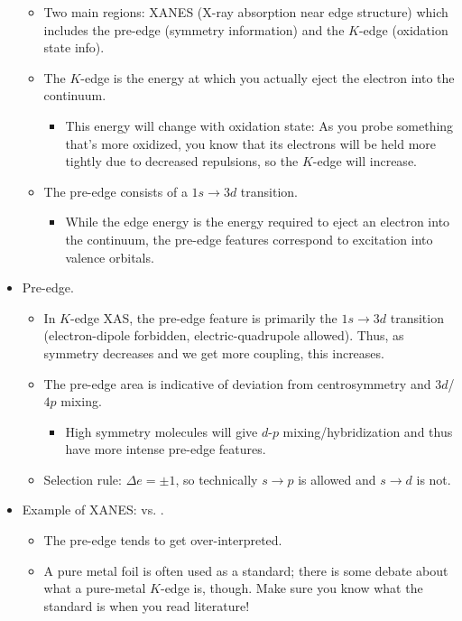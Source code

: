 \documentclass[../notes.tex]{subfiles}
\begin{document}
\begin{itemize}
\begin{itemize}
        \item Two main regions: XANES (X-ray absorption near edge structure) which includes the pre-edge (symmetry information) and the $K$-edge (oxidation state info).
        \item The $K$-edge is the energy at which you actually eject the electron into the continuum.
        \begin{itemize}
            \item This energy will change with oxidation state: As you probe something that's more oxidized, you know that its electrons will be held more tightly due to decreased repulsions, so the $K$-edge will increase.
        \end{itemize}
        \item The pre-edge consists of a $1s\to 3d$ transition.
        \begin{itemize}
            \item While the edge energy is the energy required to eject an electron into the continuum, the pre-edge features correspond to excitation into valence orbitals.
        \end{itemize}
    \end{itemize}
    \item Pre-edge.
    \begin{itemize}
        \item In $K$-edge XAS, the pre-edge feature is primarily the $1s\to 3d$ transition (electron-dipole forbidden, electric-quadrupole allowed). Thus, as symmetry decreases and we get more coupling, this increases.
        \item The pre-edge area is indicative of deviation from centrosymmetry and $3d$/$4p$ mixing.
        \begin{itemize}
            \item High symmetry molecules will give $d$-$p$ mixing/hybridization and thus have more intense pre-edge features.
        \end{itemize}
        \item Selection rule: $\Delta e=\pm 1$, so technically $s\to p$ is allowed and $s\to d$ is not.
    \end{itemize}
    \item Example of XANES:  vs. .
    \begin{itemize}
        \item The pre-edge tends to get over-interpreted.
        \item A pure metal foil is often used as a standard; there is some debate about what a pure-metal $K$-edge is, though. Make sure you know what the standard is when you read literature!

\end{itemize}
\end{itemize}
\end{document}
